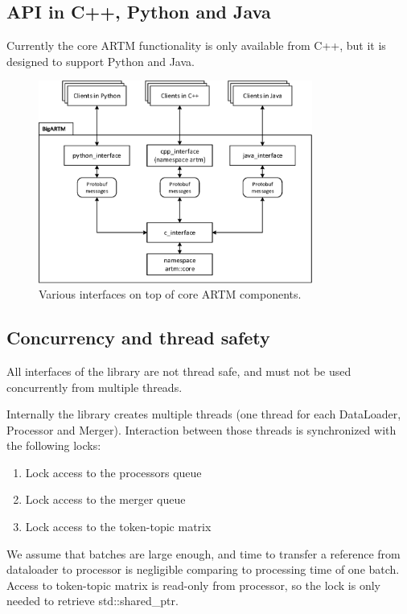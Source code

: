 \documentclass[11pt,a4paper,twoside]{report}
\begin{document}
\subsection{API in C++, Python and Java}
Currently the core ARTM functionality is only available from C++,
but it is designed to support Python and Java.

\begin{figure}[h!]
\begin{centering}
\includegraphics[width=90mm]{diagramm_BigARTM.eps}
\caption{Various interfaces on top of core ARTM components.}
\label{fig:diagramm_BigARTM}
\end{centering}
\end{figure}

\subsection{Concurrency and thread safety}
All interfaces of the library are not thread safe,
and must not be used concurrently from multiple threads.

Internally the library creates multiple threads
(one thread for each DataLoader, Processor and Merger).
Interaction between those threads is synchronized with the following locks:
\begin{enumerate}
    \item Lock access to the processors queue
    \item Lock access to the merger queue
    \item Lock access to the token-topic matrix
\end{enumerate}

We assume that batches are large enough,
and time to transfer a reference from dataloader to processor
is negligible comparing to processing time of one batch.
Access to token-topic matrix is read-only from processor,
so the lock is only needed to retrieve std::shared\_ptr.
\end{document}
